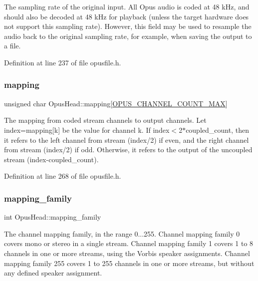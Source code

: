 The sampling rate of the original input. All Opus audio is coded at 48 k\+Hz, and should also be decoded at 48 k\+Hz for playback (unless the target hardware does not support this sampling rate). However, this field may be used to resample the audio back to the original sampling rate, for example, when saving the output to a file. 

Definition at line 237 of file opusfile.\+h.

\mbox{\label{struct_opus_head_ac6372a8a1729b034308bae47253d94b7}} 
\subsubsection{\texorpdfstring{mapping}{mapping}}
{\footnotesize\ttfamily unsigned char Opus\+Head\+::mapping\mbox{[}\mbox{\hyperlink{group__header__info_gad6f0329582430a828244045ac85a5417}{O\+P\+U\+S\+\_\+\+C\+H\+A\+N\+N\+E\+L\+\_\+\+C\+O\+U\+N\+T\+\_\+\+M\+AX}}\mbox{]}}

The mapping from coded stream channels to output channels. Let {\ttfamily index=mapping\mbox{[}k\mbox{]}} be the value for channel {\ttfamily k}. If {\ttfamily index$<$2$\ast$coupled\+\_\+count}, then it refers to the left channel from stream {\ttfamily (index/2)} if even, and the right channel from stream {\ttfamily (index/2)} if odd. Otherwise, it refers to the output of the uncoupled stream {\ttfamily (index-\/coupled\+\_\+count)}. 

Definition at line 268 of file opusfile.\+h.

\mbox{\label{struct_opus_head_a338268b4264e059ae9ede890e6177304}} 
\subsubsection{\texorpdfstring{mapping\_family}{mapping\_family}}
{\footnotesize\ttfamily int Opus\+Head\+::mapping\+\_\+family}

The channel mapping family, in the range 0...255. Channel mapping family 0 covers mono or stereo in a single stream. Channel mapping family 1 covers 1 to 8 channels in one or more streams, using the Vorbis speaker assignments. Channel mapping family 255 covers 1 to 255 channels in one or more streams, but without any defined speaker assignment. 

